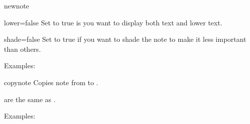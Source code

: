 \documentclass[a4paper]{article}
\begin{document}
\begin{docCommand}{newnote}{}
  \begin{docKey}{lower}{=}{false}
    Set to true is you want to display both text and lower text.
  \end{docKey}

  \begin{docKey}{shade}{=}{false}
    Set to true if you want to shade the note to make it less important than
    others.
  \end{docKey}

  Examples:
  \begin{example}
  \end{example}

  \begin{example}
  \end{example}  
\end{docCommand}


\begin{docCommand}{copynote}{}
  Copies note from  to .

   are the same as .

  Examples:
  \begin{example}
  \end{example}
  
  \begin{example}
  \end{example}

\end{docCommand}
\end{document}
